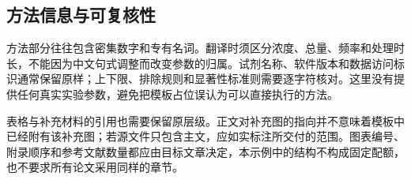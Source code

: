 { \subsection*{方法信息与可复核性}
 方法部分往往包含密集数字和专有名词。翻译时须区分浓度、总量、频率和处理时长，不能因为中文句式调整而改变参数的归属。试剂名称、软件版本和数据访问标识通常保留原样；上下限、排除规则和显著性标准则需要逐字符核对。这里没有提供任何真实实验参数，避免把模板占位误认为可以直接执行的方法。\par
 表格与补充材料的引用也需要保留原层级。正文对补充图的指向并不意味着模板中已经附有该补充图；若源文件只包含主文，应如实标注所交付的范围。图表编号、附录顺序和参考文献数量都应由目标文章决定，本示例中的结构不构成固定配额，也不要求所有论文采用同样的章节。\par
}
\newcommand{\SampleClosing}{%
 \section*{讨论：版式适配与范围}
 上方矢量图是模板原创的排版占位图，不来自任何论文。图形与完整演示图注被放在同一页，便于读者直接核对分面说明。真实项目应使用经过授权或用户提供的原图素材，并保留图注署名与许可信息。尺寸不足时，可适度缩放或调整栏宽，不以删除图注解决空间问题。\par
 模板仅记录一次已核验文章的可观察设计特征。即使文章出自同一期刊，不同年代、研究论文与综述、校正清样与正式版本也可能采用不同的页眉和引文形式。应以用户提供的实际PDF为准，不能仅凭期刊名称推断配色、字号或引用方式\SampleCiteOne。\par
 \subsection*{演示检查项}
 本样板用于展示可编译性、中文字形、标题层级、跨栏图注、页眉页脚和内部链接。图中没有实际数据，因此不应被当作科学插图引用。替换内容后，还需检查所有页的渲染结果，确认无截字、碰撞、异常空白和遗漏段落。\par
 \SampleBibliography
 \SampleSourceInfo
}
